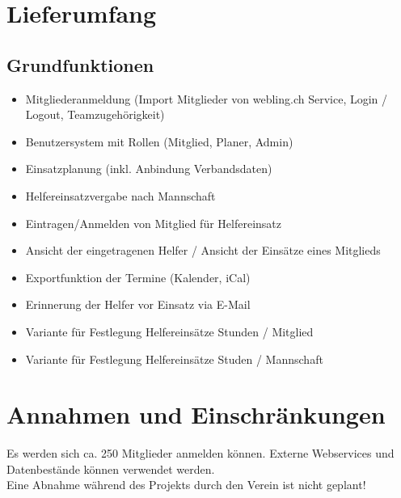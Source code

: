 \section{Lieferumfang}
\subsection{Grundfunktionen}
\begin{itemize}
    \item Mitgliederanmeldung (Import Mitglieder von webling.ch Service, Login / Logout, Teamzugehörigkeit)
    \item Benutzersystem mit Rollen (Mitglied, Planer, Admin)
    \item Einsatzplanung (inkl. Anbindung Verbandsdaten)
    \item Helfereinsatzvergabe nach Mannschaft
    \item Eintragen/Anmelden von Mitglied für Helfereinsatz
    \item Ansicht der eingetragenen Helfer / Ansicht der Einsätze eines Mitglieds
    \item Exportfunktion der Termine (Kalender, iCal)
    \item Erinnerung der Helfer vor Einsatz via E-Mail
    \item Variante für Festlegung Helfereinsätze Stunden / Mitglied
    \item Variante für Festlegung Helfereinsätze Studen  / Mannschaft
\end{itemize}

\section{Annahmen und Einschränkungen}
Es werden sich ca. 250 Mitglieder anmelden können.
Externe Webservices und Datenbestände können verwendet werden.
\\ Eine Abnahme während des Projekts durch den Verein ist nicht geplant!